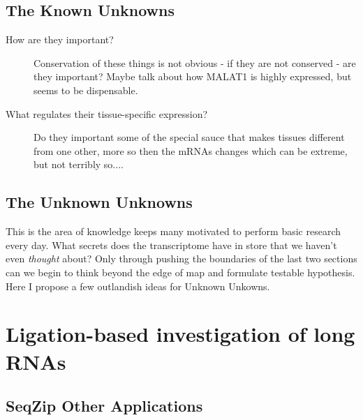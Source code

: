 \subsection{The Known Unknowns}\label{subsec: The Known Unknowns}


\begin{description}
	\item[How are they important?] 
	Conservation of these things is not obvious - if they are not conserved - are they important? Maybe talk about how MALAT1 is highly expressed, but seems to be dispensable.

	\item[What regulates their tissue-specific expression?]
	Do they important some of the special sauce that makes tissues different from one other, more so then the mRNAs changes which can be extreme, but not terribly so....

	\item[]  

\end{description}

\subsection{The Unknown Unknowns}\label{subsec: The Unknown Unknowns}

This is the area of knowledge keeps many motivated to perform basic research every day. What secrets does the transcriptome have in store that we haven't even \textit{thought} about? Only through pushing the boundaries of the last two sections can we begin to think beyond the edge of map and formulate testable hypothesis. Here I propose a few outlandish ideas for Unknown Unkowns.



\section{Ligation-based investigation of long RNAs}
\subsection{SeqZip Other Applications}
